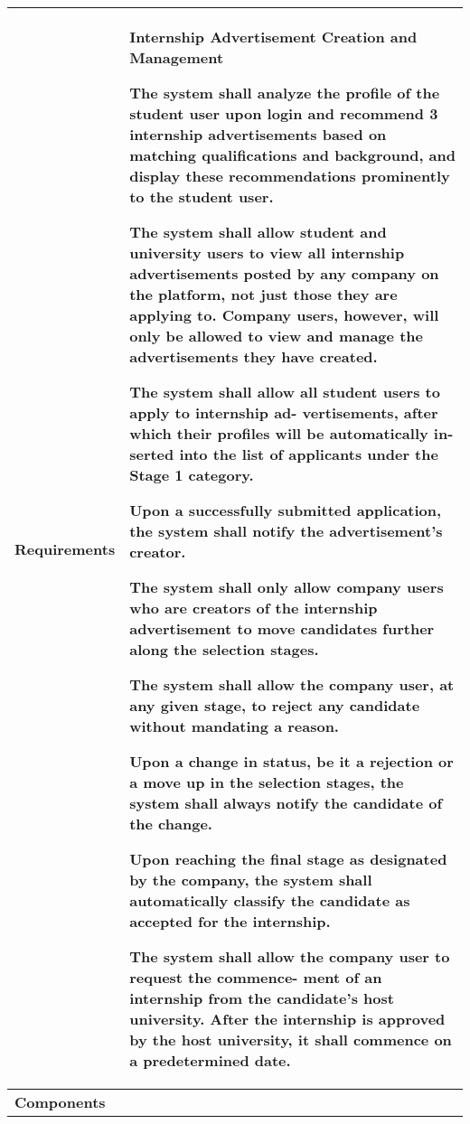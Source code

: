 \begin{table}[h]
    \centering
    \renewcommand{\arraystretch}{1.5} %
    \begin{tabular}{|C{0.3\textwidth}|L{0.65\textwidth}|} %
        \hline
        \textbf{Requirements} & 
        \textbf{Internship Advertisement Creation and Management} \par
        [FR26] The system shall analyze the profile of the student user upon login and recommend 3 internship advertisements based on matching
        qualifications and background, and display these recommendations
        prominently to the student user. \par
        [FR27] The system shall allow student and university users to view all
        internship advertisements posted by any company on the platform,
        not just those they are applying to. Company users, however, will
        only be allowed to view and manage the advertisements they have
        created. \par
        [FR28] The system shall allow all student users to apply to internship ad-
        vertisements, after which their profiles will be automatically in-
        serted into the list of applicants under the Stage 1 category. \par
        [FR29] Upon a successfully submitted application, the system shall notify
        the advertisement’s creator. \par
        [FR30] The system shall only allow company users who are creators of
        the internship advertisement to move candidates further along the
        selection stages. \par
        [FR31] The system shall allow the company user, at any given stage, to
        reject any candidate without mandating a reason. \par
        [FR32] Upon a change in status, be it a rejection or a move up in the
        selection stages, the system shall always notify the candidate of the
        change. \par
        [FR33] Upon reaching the final stage as designated by the company, the
        system shall automatically classify the candidate as accepted for
        the internship. \par
        [FR34] The system shall allow the company user to request the commence-
        ment of an internship from the candidate’s host university. After
        the internship is approved by the host university, it shall commence
        on a predetermined date. \\
        \hline
        \textbf{Components} & 
        \\
        \hline
    \end{tabular}
\end{table}


